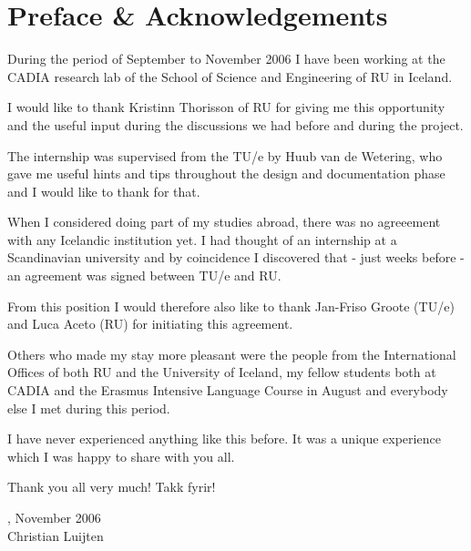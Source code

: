 \chapter*{Preface \& Acknowledgements}

During the period of September to November 2006 I have been working at the
\ac{CADIA} research lab of the School of Science and Engineering of \ac{RU} in
Iceland.

I would like to thank Kristinn Thorisson of \ac{RU} for giving me this
opportunity and the useful input during the discussions we had before and
during the project.

The internship was supervised from the \ac{TU/e} by Huub van de Wetering, who
gave me useful hints and tips throughout the design and documentation phase and
I would like to thank for that.

When I considered doing part of my studies abroad, there was no agreeement with
any Icelandic institution yet. I had thought of an internship at a Scandinavian
university and by coincidence I discovered that - just weeks before - an
agreement was signed between \ac{TU/e} and \ac{RU}. 

From this position I would therefore also like to thank Jan-Friso Groote
(\ac{TU/e}) and Luca Aceto (\ac{RU}) for initiating this agreement.

Others who made my stay more pleasant were the people from the International
Offices of both \ac{RU} and the University of Iceland, my fellow students both
at \ac{CADIA} and the Erasmus Intensive Language Course in August and everybody
else I met during this period.

I have never experienced anything like this before. It was a unique experience
which I was happy to share with you all.

\vspace{2em}

Thank you all very much! Takk fyrir!

\Rvk{}, November 2006 \\
Christian Luijten
